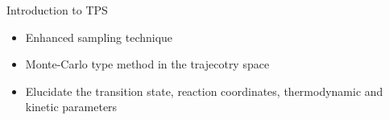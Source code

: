 \documentclass[final]{beamer}
\newlength{\colwidth}
\begin{document}
\begin{frame}[t]
\begin{columns}[t]
\begin{column}{\colwidth}
  \begin{block}{Introduction to TPS}
\begin{itemize}
    \item Enhanced sampling technique
    \item Monte-Carlo type method in the trajecotry space
    \item Elucidate the transition state, reaction coordinates, thermodynamic and kinetic parameters
\end{itemize}
\begin{figure}%
\centering
{}%
\qquad
{}
\label{fig:tps-desc}%
\end{figure}


\end{block}
\end{column}
\end{columns}
\end{frame}
\end{document}
